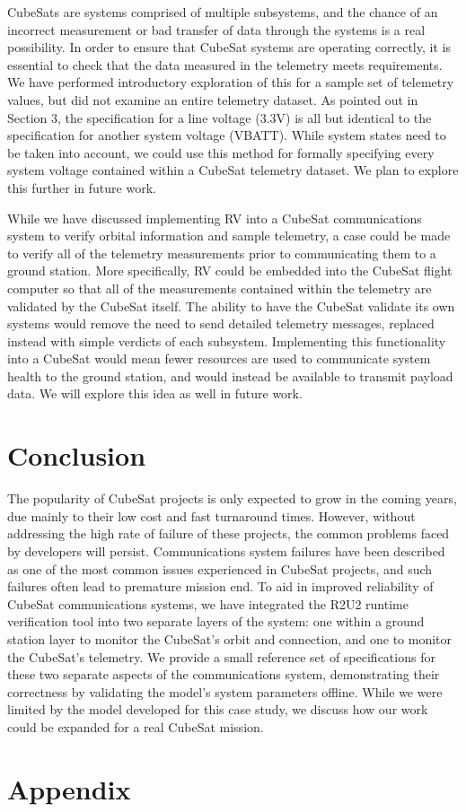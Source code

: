 \documentclass[conf]{new-aiaa}
\begin{document}
CubeSats are systems comprised of multiple subsystems, and the chance of an incorrect measurement or bad transfer of data through the systems is a real possibility. In order to ensure that CubeSat systems are operating correctly, it is essential to check that the data measured in the telemetry meets requirements. We have performed introductory exploration of this for a sample set of telemetry values, but did not examine an entire telemetry dataset. As pointed out in Section 3, the specification for a line voltage (3.3V) is all but identical to the specification for another system voltage (VBATT). While system states need to be taken into account,%
we could use this method for formally specifying every system voltage contained within a CubeSat telemetry dataset. We plan to explore this further in future work.

While we have discussed implementing RV into a CubeSat communications system to verify orbital information and sample telemetry, a case could be made to verify all of the telemetry measurements prior to communicating them to a ground station. More specifically, RV could be embedded into the CubeSat flight computer so that all of the measurements contained within the telemetry are validated by the CubeSat itself. The ability to have the CubeSat validate its own systems would remove the need to send detailed telemetry messages, replaced instead with simple verdicts of each subsystem. Implementing this functionality into a CubeSat would mean fewer resources are used to communicate system health to the ground station, and would instead be available to transmit payload data. We will explore this idea as well in future work.


\section{Conclusion}

The popularity of CubeSat projects is only expected to grow in the coming years, due mainly to their low cost and fast turnaround times. However, without addressing the high rate of failure of these projects, the common problems faced by developers will persist. Communications system failures have been described as one of the most common issues experienced in CubeSat projects, and such failures often lead to premature mission end. To aid in improved reliability of CubeSat communications systems, we have integrated the R2U2 runtime verification tool into two separate layers of the system: one within a ground station layer to monitor the CubeSat's orbit and connection, and one to monitor the CubeSat's telemetry. We provide a small reference set of specifications for these two separate aspects of the communications system, demonstrating their correctness by validating the model's system parameters offline. While we were limited by the model developed for this case study, we discuss how our work could be expanded for a real CubeSat mission.



\newpage
\section*{Appendix}

\end{document}
